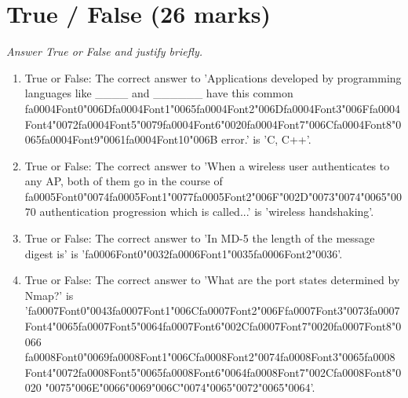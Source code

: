 \documentclass[12pt]{article}
\begin{document}
\section*{True / False (26 marks)}
\textit{Answer True or False and justify briefly.}
\begin{enumerate}[label=\arabic*.]
\item True or False: The correct answer to 'Applications developed by programming languages like \_\_\_\_ and \_\_\_\_\_\_ have this common {\csname fa0004Font0\endcsname\char"006D}{\csname fa0004Font1\endcsname\char"0065}{\csname fa0004Font2\endcsname\char"006D}{\csname fa0004Font3\endcsname\char"006F}{\csname fa0004Font4\endcsname\char"0072}{\csname fa0004Font5\endcsname\char"0079}{\csname fa0004Font6\endcsname\char"0020}{\csname fa0004Font7\endcsname\char"006C}{\csname fa0004Font8\endcsname\char"0065}{\csname fa0004Font9\endcsname\char"0061}{\csname fa0004Font10\endcsname\char"006B} error.' is 'C, C++'.
\item True or False: The correct answer to 'When a wireless user authenticates to any AP, both of them go in the course of {\csname fa0005Font0\endcsname\char"0074}{\csname fa0005Font1\endcsname\char"0077}{\csname fa0005Font2\endcsname\char"006F}{\char"002D}{\char"0073}{\char"0074}{\char"0065}{\char"0070} authentication progression which is called...' is 'wireless handshaking'.
\item True or False: The correct answer to 'In MD-5 the length of the message digest is' is '{\csname fa0006Font0\endcsname\char"0032}{\csname fa0006Font1\endcsname\char"0035}{\csname fa0006Font2\endcsname\char"0036}'.
\item True or False: The correct answer to 'What are the port states determined by Nmap?' is '{\csname fa0007Font0\endcsname\char"0043}{\csname fa0007Font1\endcsname\char"006C}{\csname fa0007Font2\endcsname\char"006F}{\csname fa0007Font3\endcsname\char"0073}{\csname fa0007Font4\endcsname\char"0065}{\csname fa0007Font5\endcsname\char"0064}{\csname fa0007Font6\endcsname\char"002C}{\csname fa0007Font7\endcsname\char"0020}{\csname fa0007Font8\endcsname\char"0066} {\csname fa0008Font0\endcsname\char"0069}{\csname fa0008Font1\endcsname\char"006C}{\csname fa0008Font2\endcsname\char"0074}{\csname fa0008Font3\endcsname\char"0065}{\csname fa0008Font4\endcsname\char"0072}{\csname fa0008Font5\endcsname\char"0065}{\csname fa0008Font6\endcsname\char"0064}{\csname fa0008Font7\endcsname\char"002C}{\csname fa0008Font8\endcsname\char"0020} {\char"0075}{\char"006E}{\char"0066}{\char"0069}{\char"006C}{\char"0074}{\char"0065}{\char"0072}{\char"0065}{\char"0064}'.

\end{enumerate}
\end{document}
